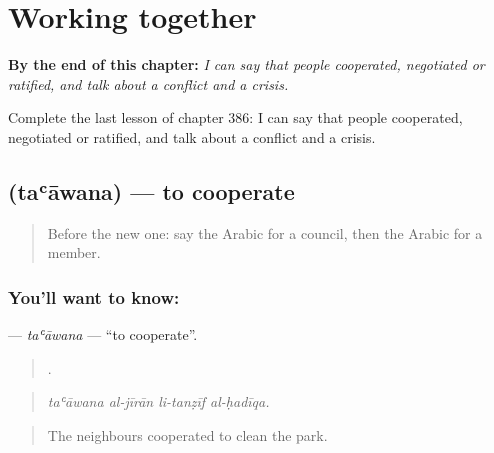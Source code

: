 
\chapter{Working together}
\label{ch:ar-working-together}

\begin{chapteropening}
\textbf{By the end of this chapter:} \emph{I can say that people cooperated, negotiated or ratified, and talk about a conflict and a crisis.}

Complete the last lesson of chapter 386: I can say that people cooperated, negotiated or ratified, and talk about a conflict and a crisis.
\end{chapteropening}

\section[\texorpdfstring{\ar{تعاون} (taʿāwana)}{تعاون (taʿāwana)}]{ (taʿāwana) — to cooperate}

\label{lesson:AR-C386-taawana}



\begin{quote}
Before the new one: say the Arabic for a council, then the Arabic for a member.
\end{quote}

\subsection*{You'll want to know: }
\textbf{} — \emph{taʿāwana} — \textquotedblleft{}to cooperate\textquotedblright{}.

\begin{quote}
   .
\end{quote}

\begin{quote}
\emph{taʿāwana al-jīrān li-tanẓīf al-ḥadīqa.}
\end{quote}

\begin{quote}
The neighbours cooperated to clean the park.
\end{quote}

